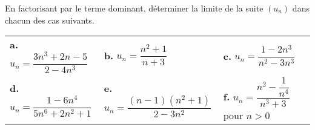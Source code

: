 \documentclass[11pt,fleqn]{book} %
\begin{document}
\begin{exercise}En factorisant par le terme dominant, déterminer la limite de la suite $(u_n)$ dans chacun des cas suivants.
\begin{center}
\renewcommand{\arraystretch}{2.5}
\begin{tabularx}{\linewidth}{XXXX}
\textbf{a.} $ u_n = \dfrac{3n^3+2n-5}{2-4n^3}$ & \textbf{b.} $ u_n = \dfrac{n^2+1}{n+3}$ & \textbf{c.} $u_n=\dfrac{1-2n^3}{n^2-3n^3}$ \\
\textbf{d.} $u_n = \dfrac{1-6n^4}{5n^6+2n^2+1}$ & \textbf{e.} $u_n=\dfrac{(n-1)(n^2+1)}{2-3n^2}$ & \textbf{f.} $ u_n = \dfrac{n^2-\dfrac{1}{n^4}}{n^3+3}$  pour $n>0$ 

\end{tabularx}
\end{center}
\newpage
\end{exercise}
\end{document}
